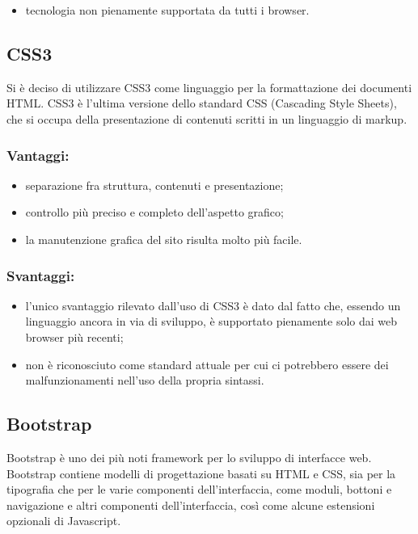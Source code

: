\documentclass[a4paper, titlepage]{article}
\begin{document}
\begin{itemize}
	\item tecnologia non pienamente supportata da tutti i browser.
\end{itemize}

\subsection{CSS3}
Si è deciso di utilizzare CSS3 come linguaggio per la formattazione dei documenti HTML. CSS3 è l'ultima versione dello standard CSS (Cascading Style Sheets), che si occupa della presentazione di contenuti scritti in un linguaggio di markup.

\subsubsection{Vantaggi:}

\begin{itemize}
	\item separazione fra struttura, contenuti e presentazione;
	\item controllo più preciso e completo dell'aspetto grafico;
	\item la manutenzione grafica del sito risulta molto più facile.
\end{itemize}

\subsubsection{Svantaggi:}

\begin{itemize}
	\item l’unico svantaggio rilevato dall’uso di CSS3 è dato dal fatto che, essendo un linguaggio ancora in via di sviluppo, è supportato pienamente solo dai web browser più recenti;
	\item non è riconosciuto come standard attuale per cui ci potrebbero essere dei malfunzionamenti nell'uso della propria sintassi. 
\end{itemize}

\subsection{Bootstrap}
Bootstrap è uno dei più noti framework per lo sviluppo di interfacce web. Bootstrap contiene modelli di progettazione basati su HTML e CSS, sia per la tipografia che per le varie componenti dell'interfaccia, come moduli, bottoni e navigazione e altri componenti dell'interfaccia, così come alcune estensioni opzionali di Javascript.
\end{document}
